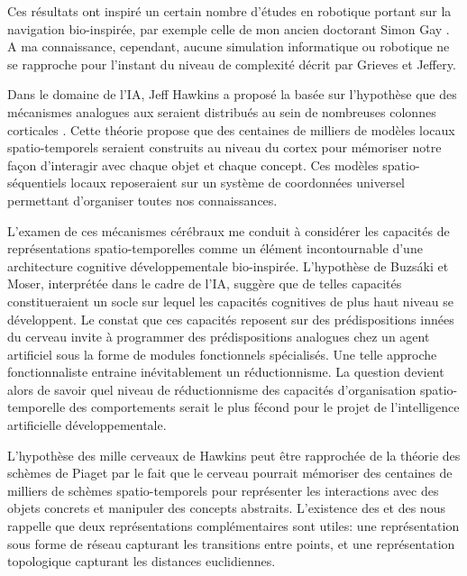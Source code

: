 Ces résultats ont inspiré un certain nombre d'études en robotique portant sur la navigation bio-inspirée, 
par exemple celle de mon ancien doctorant Simon Gay \cite{gay_towards_2021}.
A ma connaissance, cependant, aucune simulation informatique ou robotique ne se rapproche pour l'instant du niveau de complexité décrit par Grieves et Jeffery.

Dans le domaine de l'IA, Jeff Hawkins a proposé la  basée sur l'hypothèse que des mécanismes analogues aux  seraient distribués au sein de nombreuses colonnes corticales  \cite{hawkins_framework_2019}. 
Cette théorie propose que des centaines de milliers de modèles locaux spatio-temporels seraient construits au niveau du cortex pour mémoriser notre façon d'interagir avec chaque objet et chaque concept.
Ces modèles spatio-séquentiels locaux reposeraient sur un système de coordonnées universel permettant d'organiser toutes nos connaissances. 

L'examen de ces mécanismes cérébraux me conduit à considérer les capacités de représentations spatio-temporelles comme un élément incontournable d'une architecture cognitive développementale bio-inspirée.
L'hypothèse de Buzsáki et Moser, interprétée dans le cadre de l'IA, suggère que de telles capacités constitueraient un socle sur lequel les capacités cognitives de plus haut niveau se développent. 
Le constat que ces capacités reposent sur des prédispositions innées du cerveau invite à programmer des prédispositions analogues chez un agent artificiel sous la forme de modules fonctionnels spécialisés.
Une telle approche fonctionnaliste entraine inévitablement un réductionnisme.
La question devient alors de savoir quel niveau de réductionnisme des capacités d'organisation spatio-temporelle des comportements serait le plus fécond pour le projet de l'intelligence artificielle développementale.

L'hypothèse des mille cerveaux de Hawkins peut être rapprochée de la théorie des schèmes de Piaget par le fait que le cerveau pourrait mémoriser des centaines de milliers de schèmes spatio-temporels pour représenter les interactions avec des objets concrets et manipuler des concepts abstraits. 
L'existence des  et des  nous rappelle que deux représentations complémentaires sont utiles: une représentation sous forme de réseau capturant les transitions entre points, et une représentation topologique capturant les distances euclidiennes.  

